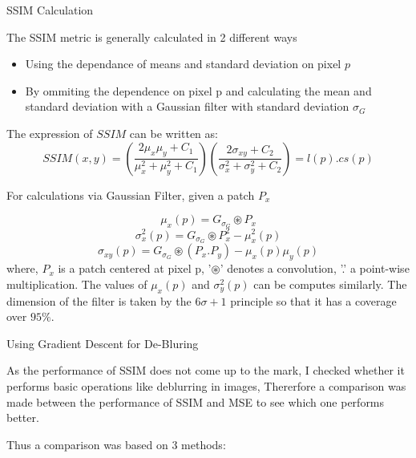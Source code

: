 \documentclass[a4paper, 15pt]{article}
\begin{document}
	\newpage
	\begin{center}
		{\fontsize{20}{30}\selectfont SSIM Calculation}\
	\end{center}
	\par
	The SSIM metric is generally calculated in 2 different ways 
	\par
	\begin{itemize}
		\item Using the dependance of means and standard deviation on pixel $p$
		\item By ommiting the dependence on pixel p and calculating the mean and standard deviation with a Gaussian filter with standard deviation $\sigma_{G}$
	\end{itemize}
	The expression of $SSIM$ can be written as:
	\begin{equation}
	SSIM(x, y) = \left( \frac{2\mu_{x}\mu_{y} + C_{1}}{\mu^2_{x}+\mu^2_{y} + C_{1}} \right)\left( \frac{2\sigma_{xy} + C_{2}}{\sigma^2_{x} + \sigma^2_{y} + C_{2}}\right)  = l(p).cs(p)
	\end{equation}
	\par
	For calculations via Gaussian Filter, given a patch $P_{x}$ 
	\par
	\begin{equation}
	\mu_{x}(p) = G_{\sigma_{G}}\circledast P_{x}
	\end{equation}
	\begin{equation}
	\sigma^2_{x}(p) = G_{\sigma_{G}}\circledast P^2_{x} - \mu^2_{x}(p)
	\end{equation}
	\begin{equation}
	\sigma_{xy}(p) = G_{\sigma_{G}}\circledast (P_{x}.P_{y})- \mu_{x}(p)\mu_{y}(p)
	\end{equation}
	where, $P_{x}$ is a patch centered at pixel p, '$\circledast$' denotes a convolution, '.' a point-wise multiplication. The values of $\mu_{x}(p)$ and $\sigma^2_{y}(p)$ can be computes similarly. The dimension of the filter is taken by the $6\sigma+1$ principle so that it has a coverage over $95\% $.
	\newpage
	\begin{center}
		{\fontsize{20}{30}\selectfont Using Gradient Descent for De-Bluring}\
	\end{center}
	\par
	As the performance of SSIM does not come up to the mark, I checked whether it performs basic operations like deblurring in images, Thererfore a comparison was made between the performance of SSIM and MSE to see which one performs better. \par
	Thus a comparison was based on 3 methods:
\end{document}
